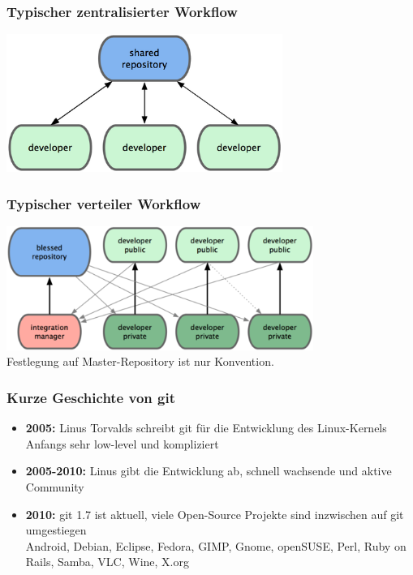 \begin{frame}
  \frametitle{Typischer zentralisierter Workflow}
  \begin{center}
    \includegraphics[width=9cm]{img/centralized_workflow.png}
  \end{center}
\end{frame}

\begin{frame}
  \frametitle{Typischer verteiler Workflow}
  \begin{center}
    \includegraphics[width=10cm]{img/distributed_workflow.png} \\
    \vspace{0.5cm}
    Festlegung auf Master-Repository ist nur Konvention.
  \end{center}
\end{frame}

\begin{frame}
  \frametitle{Kurze Geschichte von git}
  \begin{itemize}
    \item {\bf 2005:} Linus Torvalds schreibt git für die Entwicklung des Linux-Kernels \\ Anfangs sehr low-level und kompliziert
    \item {\bf 2005-2010:} Linus gibt die Entwicklung ab, schnell wachsende und aktive Community
    \item {\bf 2010:} git 1.7 ist aktuell, viele Open-Source Projekte sind inzwischen auf git umgestiegen \\ Android, Debian, Eclipse, Fedora, GIMP, Gnome, openSUSE, Perl, Ruby on Rails, Samba, VLC, Wine, X.org
    \end{itemize}
\end{frame}


